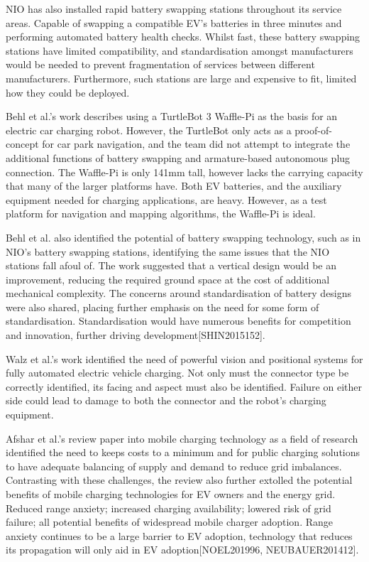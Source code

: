 \documentclass [12pt]{article}
\begin{document}
NIO has also installed rapid battery swapping stations throughout its service areas\cite{nio-power}. Capable of swapping a compatible EV’s batteries in three minutes and performing automated battery health checks. Whilst fast, these battery swapping stations have limited compatibility, and standardisation amongst manufacturers would be needed to prevent fragmentation of services between different manufacturers. Furthermore, such stations are large and expensive to fit, limited how they could be deployed.

Behl et al.’s work describes using a TurtleBot 3 Waffle-Pi as the basis for an electric car charging robot\cite{behl2019autonomous}. However, the TurtleBot only acts as a proof-of-concept for car park navigation, and the team did not attempt to integrate the additional functions of battery swapping and armature-based autonomous plug connection. The Waffle-Pi is only 141mm tall, however lacks the carrying capacity that many of the larger platforms have. Both EV batteries, and the auxiliary equipment needed for charging applications, are heavy. However, as a test platform for navigation and mapping algorithms, the Waffle-Pi is ideal.

Behl et al. also identified the potential of battery swapping technology, such as in NIO’s battery swapping stations, identifying the same issues that the NIO stations fall afoul of\cite{behl2019autonomous}. The work suggested that a vertical design would be an improvement, reducing the required ground space at the cost of additional mechanical complexity. The concerns around standardisation of battery designs were also shared, placing further emphasis on the need for some form of standardisation. Standardisation would have numerous benefits for competition and innovation, further driving development[SHIN2015152].

Walz et al.’s work identified the need of powerful vision and positional systems for fully automated electric vehicle charging\cite{walzel2019robot}. Not only must the connector type be correctly identified, its facing and aspect must also be identified. Failure on either side could lead to damage to both the connector and the robot’s charging equipment. 

Afshar et al.’s review paper into mobile charging technology as a field of research identified the need to keeps costs to a minimum and for public charging solutions to have adequate balancing of supply and demand to reduce grid imbalances\cite{afshar2020literature}. Contrasting with these challenges, the review also further extolled the potential benefits of mobile charging technologies for EV owners and the energy grid. Reduced range anxiety; increased charging availability; lowered risk of grid failure; all potential benefits of widespread mobile charger adoption. Range anxiety continues to be a large barrier to EV adoption, technology that reduces its propagation will only aid in EV adoption[NOEL201996, NEUBAUER201412].
\end{document}

